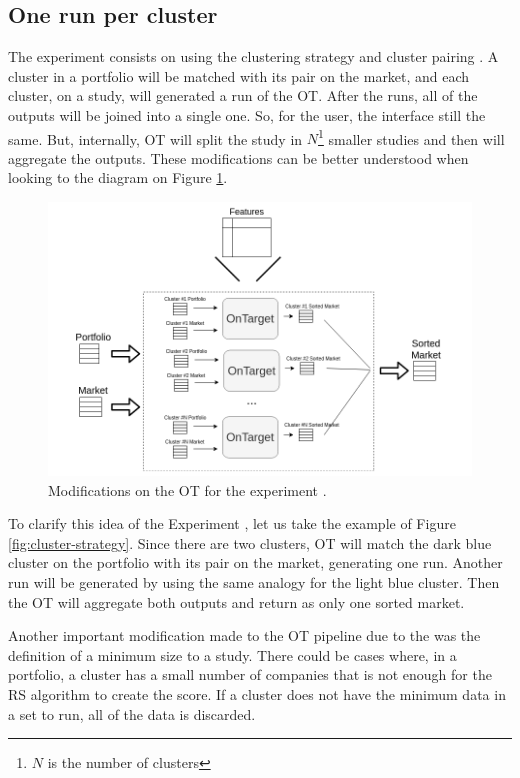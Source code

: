 \subsection{One run per cluster}
\label{ch:experiment-i}

The experiment \nameExperimentI{} consists on using the clustering strategy \nameClusterStrategyA{} and cluster pairing \nameClusterPairingA{}. A cluster in a portfolio will be matched with its pair on the market, and each cluster, on a study, will generated a run of the OT. After the runs, all of the outputs will be joined into a single one. So, for the user, the interface still the same. But, internally, OT will split the study in $N$\footnote{$N$ is the number of clusters} smaller studies and then will aggregate the outputs. These modifications can be better understood when looking to the diagram on Figure \ref{fig:one-run-each-cluster}. 

\begin{figure}[h]
   \centering
   \includegraphics[width=\linewidth]{fig/ch3-one-run-each-cluster.png}
   \caption{Modifications on the OT for the experiment \nameExperimentI{}.}
   \label{fig:one-run-each-cluster}
\end{figure}

To clarify this idea of the Experiment \nameExperimentI{}, let us take the example of Figure \ref{fig:cluster-strategy}. Since there are two clusters, OT will match the dark blue cluster on the portfolio with its pair on the market, generating one run. Another run will be generated by using the same analogy for the light blue cluster. Then the OT will aggregate both outputs and return as only one sorted market.

Another important modification made to the OT pipeline due to the \nameExperimentI{} was the definition of a minimum size to a study. There could be cases where, in a portfolio, a cluster has a small number of companies that is not enough for the RS algorithm to create the score. If a cluster does not have the minimum data in a set to run, all of the data is discarded.

